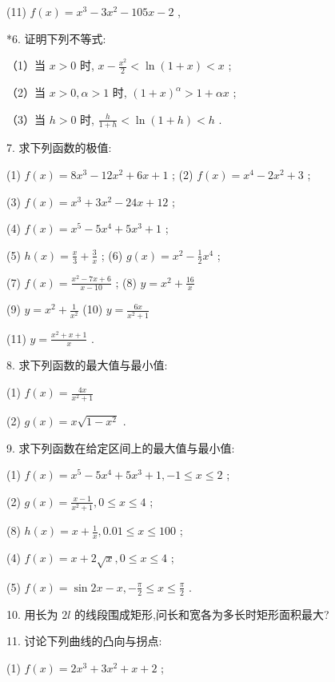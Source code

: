 \documentclass[lang=cn,newtx,10pt,scheme=chinese]{elegantbook}
\begin{document}
(11) \(f\left( x\right) = {x}^{3} - 3{x}^{2} - {105x} - 2\) ,

*6. 证明下列不等式:

（1）当 \(x > 0\) 时, \(x - \frac{{x}^{2}}{2} < \ln \left( {1 + x}\right) < x\) ;

（2）当 \(x > 0,\alpha > 1\) 时, \({\left( 1 + x\right) }^{\alpha } > 1 + {\alpha x}\) ;

（3）当 \(h > 0\) 时, \(\frac{h}{1 + h} < \ln \left( {1 + h}\right) < h\) .

7. 求下列函数的极值:

(1) \(f\left( x\right) = 8{x}^{3} - {12}{x}^{2} + {6x} + 1\) ; (2) \(f\left( x\right) = {x}^{4} - 2{x}^{2} + 3\) ;

(3) \(f\left( x\right) = {x}^{3} + 3{x}^{2} - {24x} + {12}\) ;

(4) \(f\left( x\right) = {x}^{5} - 5{x}^{4} + 5{x}^{3} + 1\) ;

(5) \(h\left( x\right) = \frac{x}{3} + \frac{3}{x}\) ; (6) \(g\left( x\right) = {x}^{2} - \frac{1}{2}{x}^{4}\) ;

(7) \(f\left( x\right) = \frac{{x}^{2} - {7x} + 6}{x - {10}}\) ; (8) \(y = {x}^{2} + \frac{16}{x}\)

(9) \(y = {x}^{2} + \frac{1}{{x}^{2}}\) (10) \(y = \frac{6x}{{x}^{2} + 1}\)

(11) \(y = \frac{{x}^{2} + x + 1}{x}\) .

8. 求下列函数的最大值与最小值:

(1) \(f\left( x\right) = \frac{4x}{{x}^{2} + 1}\)

(2) \(g\left( x\right) = x\sqrt{1 - {x}^{2}}\) .

9. 求下列函数在给定区间上的最大值与最小值:

(1) \(f\left( x\right) = {x}^{5} - 5{x}^{4} + 5{x}^{3} + 1, - 1 \leq x \leq 2\) ;

(2) \(g\left( x\right) = \frac{x - 1}{{x}^{2} + 1},0 \leq x \leq 4\) ;

(8) \(h\left( x\right) = x + \frac{1}{x},{0.01} \leq x \leq {100}\) ;

(4) \(f\left( x\right) = x + 2\sqrt{x},0 \leq x \leq 4\) ;

(5) \(f\left( x\right) = \sin {2x} - x, - \frac{\pi }{2} \leq x \leq \frac{\pi }{2}\) .

10. 用长为 \({2l}\) 的线段围成矩形,问长和宽各为多长时矩形面积最大?

11. 讨论下列曲线的凸向与拐点:

(1) \(f\left( x\right) = 2{x}^{3} + 3{x}^{2} + x + 2\) ;
\end{document}
